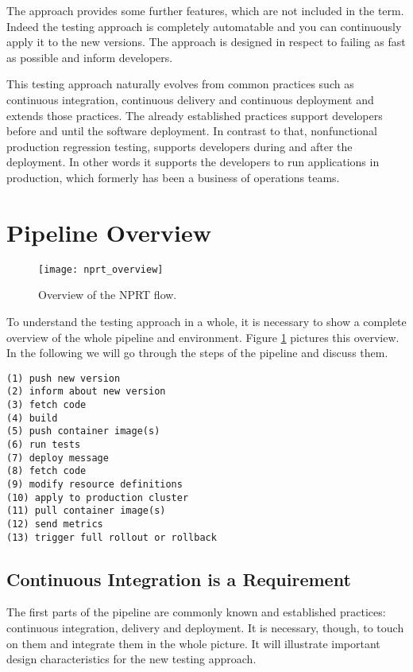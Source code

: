 The approach provides some further features, which are not included in the term. Indeed
the testing approach is completely automatable and you can continuously apply it to the
new versions. The approach is designed in respect to failing as fast as possible and
inform developers.

This testing approach naturally evolves from common practices such as continuous
integration, continuous delivery and continuous deployment and extends those
practices. The already established practices support developers before and until the
software deployment. In contrast to that, nonfunctional production regression testing,
supports developers during and after the deployment. In other words it supports the
developers to run applications in production, which formerly has been a business of
operations teams.

\section{Pipeline Overview}

\begin{figure}[htbp]
  \texttt{[image: nprt\_overview]}
  \caption[nprtflow]{Overview of the NPRT flow.}
  \label{fig:nprt_flow}
\end{figure}

To understand the testing approach in a whole, it is necessary to show a complete overview
of the whole pipeline and environment. Figure \ref{fig:nprt_flow} pictures this
overview. In the following we will go through the steps of the pipeline and discuss them.

\begin{verbatim}
(1) push new version
(2) inform about new version
(3) fetch code
(4) build
(5) push container image(s)
(6) run tests
(7) deploy message
(8) fetch code
(9) modify resource definitions
(10) apply to production cluster
(11) pull container image(s)
(12) send metrics
(13) trigger full rollout or rollback
\end{verbatim}

\subsection{Continuous Integration is a Requirement}

The first parts of the pipeline are commonly known and established practices: continuous
integration, delivery and deployment. It is necessary, though, to touch on them and
integrate them in the whole picture. It will illustrate important design characteristics
for the new testing approach.

